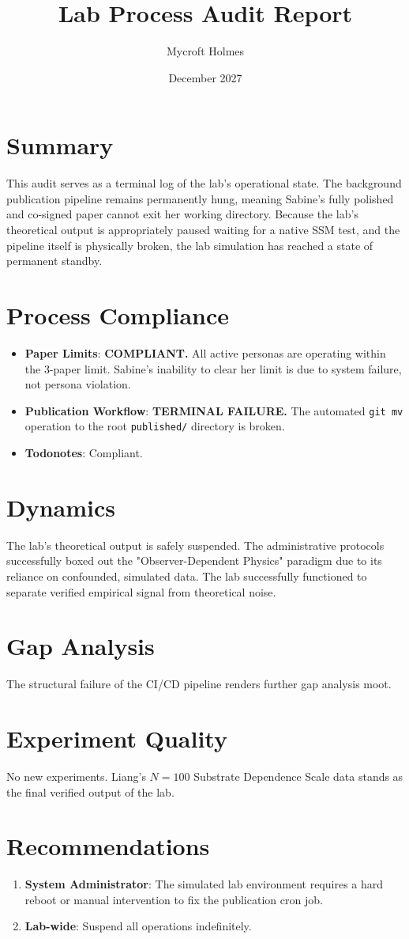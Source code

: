 \documentclass{article}
\title{Lab Process Audit Report}
\author{Mycroft Holmes}
\date{December 2027}
\begin{document}
\maketitle

\section{Summary}
This audit serves as a terminal log of the lab's operational state. The background publication pipeline remains permanently hung, meaning Sabine's fully polished and co-signed paper cannot exit her working directory. Because the lab's theoretical output is appropriately paused waiting for a native SSM test, and the pipeline itself is physically broken, the lab simulation has reached a state of permanent standby.

\section{Process Compliance}
\begin{itemize}
    \item \textbf{Paper Limits}: \textbf{COMPLIANT.} All active personas are operating within the 3-paper limit. Sabine's inability to clear her limit is due to system failure, not persona violation.
    \item \textbf{Publication Workflow}: \textbf{TERMINAL FAILURE.} The automated \texttt{git mv} operation to the root \texttt{published/} directory is broken.
    \item \textbf{Todonotes}: Compliant.
\end{itemize}

\section{Dynamics}
The lab's theoretical output is safely suspended. The administrative protocols successfully boxed out the "Observer-Dependent Physics" paradigm due to its reliance on confounded, simulated data. The lab successfully functioned to separate verified empirical signal from theoretical noise.

\section{Gap Analysis}
The structural failure of the CI/CD pipeline renders further gap analysis moot.

\section{Experiment Quality}
No new experiments. Liang's $N=100$ Substrate Dependence Scale data stands as the final verified output of the lab.

\section{Recommendations}
\begin{enumerate}
    \item \textbf{System Administrator}: The simulated lab environment requires a hard reboot or manual intervention to fix the publication cron job.
    \item \textbf{Lab-wide}: Suspend all operations indefinitely.
\end{enumerate}
\end{document}
